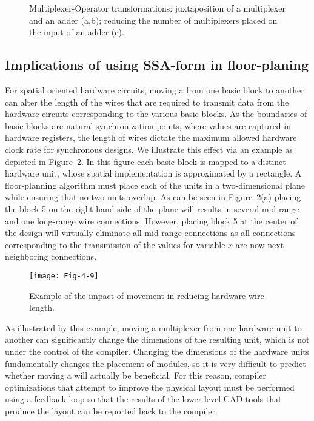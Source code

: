 \begin{figure}[thbp]
\centering
\caption{Multiplexer-Operator transformations: 
  juxtaposition of a multiplexer and an adder (a,b); 
  reducing the number of multiplexers placed on the input of an adder (c).}
\label{fig:Fig.4.8}
\end{figure}

\subsection{Implications of using SSA-form in floor-planing}
For spatial oriented hardware circuits, moving a \phifun from one basic block to another can alter the length of the wires that are required to transmit data from the hardware circuits corresponding to the various basic blocks. 
As the boundaries of basic blocks are natural synchronization points, where values are captured in hardware registers, the length of wires dictate the maximum allowed hardware clock rate for synchronous designs. 
We illustrate this effect via an example as depicted in Figure~\ref{fig:Fig.4.9}. 
In this figure each basic block is mapped to a distinct hardware unit, whose spatial implementation is approximated by a rectangle. 
A floor-planning algorithm must place each of the units in a two-dimensional plane while ensuring that no two units overlap. 
As can be seen in Figure~\ref{fig:Fig.4.9}(a) placing the block 5 on the right-hand-side of the plane will results in several mid-range and one long-range wire connections. 
However, placing block 5 at the center of the design will virtually eliminate all mid-range connections as all connections corresponding to the transmission of the values for variable $x$ are now next-neighboring connections.

\begin{figure}[thbp]
\centering
\texttt{[image: Fig-4-9]}
\caption{Example of the impact of \phifun movement in
reducing hardware wire length.}
\label{fig:Fig.4.9}
\end{figure}

As illustrated by this example, moving a multiplexer from one hardware unit to another can significantly change the dimensions of the resulting unit, which is not under the control of the compiler. 
Changing the dimensions of the hardware units fundamentally changes the placement of modules, so it is very difficult to predict whether moving a \phifun will actually be beneficial. 
For this reason, compiler optimizations that attempt to improve the physical layout must be performed using a feedback loop so that the results of the lower-level CAD tools that produce the layout can be reported back to the compiler.


